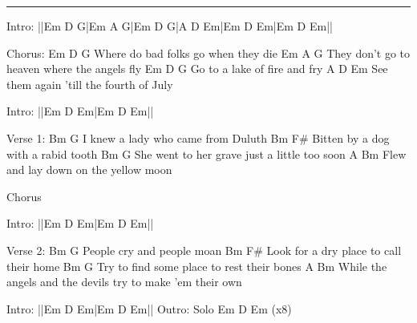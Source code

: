 \noindent\rule{\columnwidth}{1pt}


\begin{lstsong}
Intro: ||Em   D G|Em  A G|Em  D G|A  D Em|Em  D Em|Em  D Em||

Chorus:
Em                   D            G
 Where do bad folks go when they die
      Em                          A          G  
They don't go to heaven where the angels fly
Em               D        G
Go to a lake of fire and fry
 A                        D         Em
See them again 'till the fourth of July

Intro: ||Em    D Em|Em   D Em||

Verse 1:
Bm                 G
I knew a lady who came from Duluth
Bm                      F#
Bitten by a dog with a rabid tooth
    Bm                        G
She went to her grave just a little too soon
  A                              Bm
Flew and lay down on the yellow moon

Chorus

Intro: ||Em    D Em|Em   D Em||

Verse 2:
Bm              G
People cry and people moan
 Bm                      F#
Look for a dry place to call their home
Bm                         G
Try to find some place to rest their bones
          A                            Bm
While the angels and the devils try to make 'em their own

Intro: ||Em    D Em|Em   D Em||
Outro: Solo  Em    D Em (x8)
\end{lstsong}
\newpage
